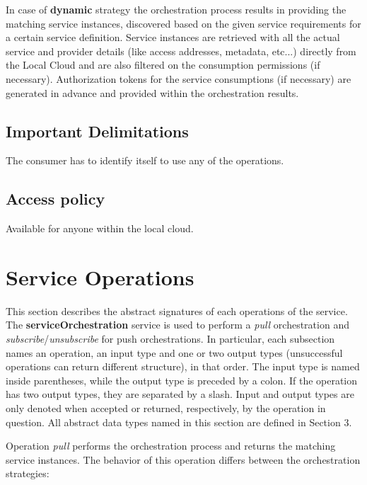 \documentclass[a4paper]{arrowhead}
\begin{document}
In case of \textbf{dynamic} strategy the orchestration process results in providing the matching service instances, discovered based on the given service requirements for a certain service definition. Service instances are retrieved with all the actual service and provider details (like access addresses, metadata, etc...) directly from the Local Cloud and are also filtered on the consumption permissions (if necessary). Authorization tokens for the service consumptions (if necessary) are generated in advance and provided within the orchestration results. 

\subsection{Important Delimitations}
\label{sec:delimitations}

The consumer has to identify itself to use any of the operations.

\subsection{Access policy}
\label{sec:accesspolicy}

Available for anyone within the local cloud.

\newpage

\section{Service Operations}
\label{sec:functions}

This section describes the abstract signatures of each operations of the service. The \textbf{serviceOrchestration} service is used to perform a \textit{pull} orchestration and  \textit{subscribe}/\textit{unsubscribe} for push orchestrations.
In particular, each subsection names an operation, an input type and one or two output types (unsuccessful operations can return different structure), in that order.
The input type is named inside parentheses, while the output type is preceded by a colon. If the operation has two output types, they are separated by a slash.
Input and output types are only denoted when accepted or returned, respectively, by the operation in question. All abstract data types named in this section are defined in Section 3.

{}

Operation \textit{pull}  performs the orchestration process and returns the matching service instances. The behavior of this operation differs between the orchestration strategies:
\end{document}
